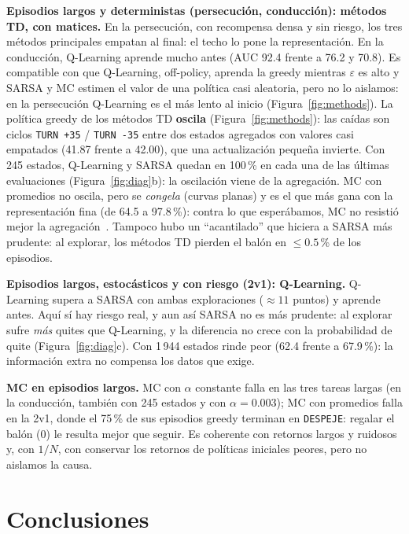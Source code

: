 \documentclass[11pt,a4paper]{article}
\begin{document}
\textbf{Episodios largos y deterministas (persecución, conducción): métodos TD, con matices.} En la persecución, con
recompensa densa y sin riesgo, los tres métodos principales empatan al final: el techo lo pone la representación. En
la conducción, Q-Learning aprende mucho antes (AUC 92.4 frente a 76.2 y 70.8). Es compatible con que Q-Learning,
off-policy, aprenda la greedy mientras $\varepsilon$ es alto y SARSA y MC estimen el valor de una política casi
aleatoria, pero no lo aislamos: en la persecución Q-Learning es el más lento al inicio (Figura~\ref{fig:methods}). La política
greedy de los métodos TD \textbf{oscila} (Figura~\ref{fig:methods}): las caídas son ciclos \texttt{TURN +35} /
\texttt{TURN -35} entre dos estados agregados con valores casi empatados (41.87 frente a 42.00), que una actualización
pequeña invierte. Con 245 estados, Q-Learning y SARSA quedan en 100\,\% en cada una de las últimas evaluaciones
(Figura~\ref{fig:diag}b): la oscilación viene de la agregación. MC con promedios no oscila, pero se \emph{congela}
(curvas planas) y es el que más gana con la representación fina (de 64.5 a 97.8\,\%): contra lo que esperábamos, MC no
resistió mejor la agregación~\cite{singh1994}. Tampoco hubo un ``acantilado'' que hiciera a SARSA más prudente: al
explorar, los métodos TD pierden el balón en $\le 0.5$\,\% de los episodios.

\textbf{Episodios largos, estocásticos y con riesgo (2v1): Q-Learning.} Q-Learning supera a SARSA con ambas
exploraciones ($\approx 11$ puntos) y aprende antes. Aquí sí hay riesgo real, y aun así SARSA no es más prudente: al
explorar sufre \emph{más} quites que Q-Learning, y la diferencia no crece con la probabilidad de quite
(Figura~\ref{fig:diag}c). Con 1\,944 estados rinde peor (62.4 frente a 67.9\,\%): la información extra no compensa los
datos que exige.

\textbf{MC en episodios largos.} MC con $\alpha$ constante falla en las tres tareas largas (en la conducción,
también con 245 estados y con $\alpha = 0.003$); MC con promedios falla en la 2v1, donde el 75\,\% de sus episodios greedy terminan en
\texttt{DESPEJE}: regalar el balón (0) le resulta mejor que seguir. Es coherente con retornos largos y ruidosos y, con
$1/N$, con conservar los retornos de políticas iniciales peores, pero no aislamos la causa.

\section{Conclusiones}
\end{document}
